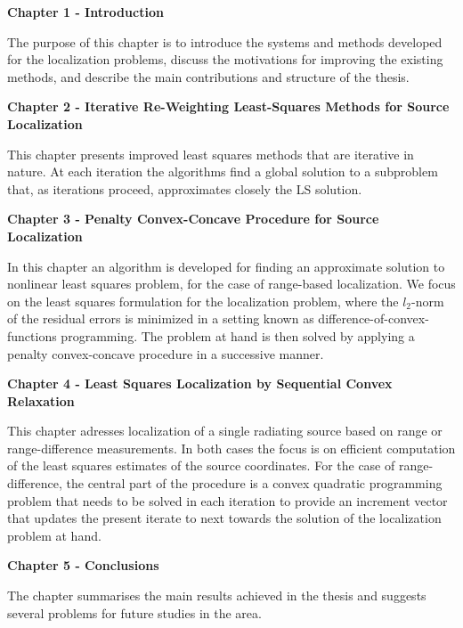 \phantom{m}

\noindent
\textbf{Chapter 1 - Introduction}

\phantom{m}

\noindent
The purpose of this chapter is to introduce the systems and methods developed for the localization problems, discuss the motivations for improving the existing methods, and describe the main contributions and structure of the thesis.


\phantom{m}

\noindent
\textbf{Chapter 2 - Iterative Re-Weighting Least-Squares Methods for Source Localization}


\phantom{m}

\noindent
This chapter presents improved least squares methods that are iterative in nature. At each iteration the algorithms find a global solution to a subproblem that, as iterations proceed, approximates closely the LS solution.


\phantom{m}

\noindent
\textbf{Chapter 3 - Penalty Convex-Concave Procedure for Source Localization}


\phantom{m}

\noindent
In this chapter an algorithm is developed for finding an approximate solution to nonlinear least squares problem, for the case of range-based localization. We focus on the least squares formulation for the localization problem, where the $l_2$-norm of the residual errors is minimized in a setting known as difference-of-convex-functions programming. The problem at hand is then solved by applying a penalty convex-concave procedure in a successive manner.


\phantom{m}

\noindent
\textbf{Chapter 4 - Least Squares Localization by Sequential Convex Relaxation}


\phantom{m}

\noindent
This chapter adresses localization of a single radiating source based on range or range-difference measurements. In both cases the focus is on efficient computation of the least squares estimates of the source coordinates. For the case of range-difference, the central part of the procedure is a convex quadratic programming problem that needs to be solved in each iteration to provide an increment vector that updates the present iterate to next towards the solution of the localization problem at hand.

\phantom{m}

\noindent
\textbf{Chapter 5 - Conclusions}

\phantom{m}

\noindent
The chapter summarises the main results achieved in the thesis and suggests several problems for future studies in the area.
